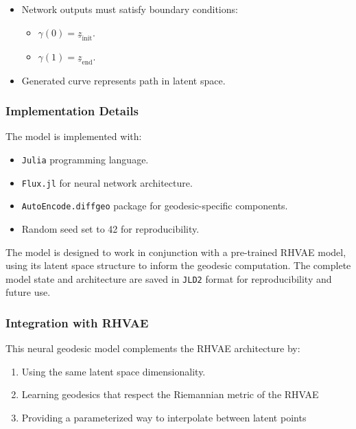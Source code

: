 \documentclass[
]{scrartcl}
\providecommand{\tightlist}{%
  \setlength{\itemsep}{0pt}\setlength{\parskip}{0pt}}
\begin{document}
\begin{refsection}
\begin{enumerate}
  \begin{itemize}
  \tightlist
  \item
    Network outputs must satisfy boundary conditions:

    \begin{itemize}
    \tightlist
    \item
      \(\gamma(0) = \underline{z}_{\text{init}}\).
    \item
      \(\gamma(1) = \underline{z}_{\text{end}}\).
    \end{itemize}
  \item
    Generated curve represents path in latent space.
  \end{itemize}
\end{enumerate}

\subsubsection{Implementation Details}\label{implementation-details-2}

The model is implemented with:

\begin{itemize}
\item
  \texttt{Julia} programming language.
\item
  \texttt{Flux.jl} for neural network architecture.
\item
  \texttt{AutoEncode.diffgeo} package for geodesic-specific components.
\item
  Random seed set to 42 for reproducibility.
\end{itemize}

The model is designed to work in conjunction with a pre-trained RHVAE
model, using its latent space structure to inform the geodesic
computation. The complete model state and architecture are saved in
\texttt{JLD2} format for reproducibility and future use.

\subsubsection{Integration with RHVAE}\label{integration-with-rhvae}

This neural geodesic model complements the RHVAE architecture by:

\begin{enumerate}
\def\labelenumi{\arabic{enumi}.}
\item
  Using the same latent space dimensionality.
\item
  Learning geodesics that respect the Riemannian metric of the RHVAE
\item
  Providing a parameterized way to interpolate between latent points
\end{enumerate}


\end{refsection}
\end{document}
